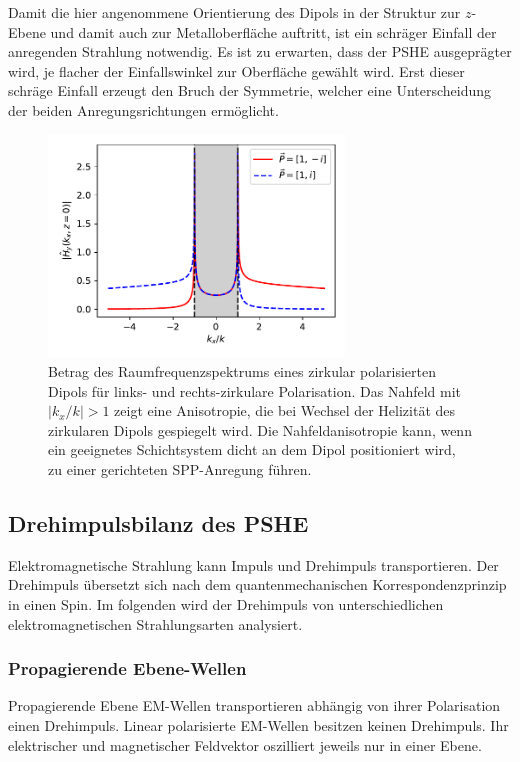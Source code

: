 \documentclass[a4paper, titlepage,  ngerman]{book}
\begin{document}
	Damit die hier angenommene Orientierung des Dipols in der Struktur zur $z$-Ebene und damit auch zur Metalloberfläche auftritt, ist ein schräger Einfall der anregenden Strahlung notwendig. Es ist zu erwarten, dass der PSHE ausgeprägter wird, je flacher der Einfallswinkel zur Oberfläche gewählt wird. Erst dieser schräge Einfall erzeugt den Bruch der Symmetrie, welcher eine Unterscheidung der beiden Anregungsrichtungen ermöglicht.
	\begin{figure}
		\centering
		\includegraphics[width=0.7\textwidth]{figures/spatial_spectrum_circ.pdf}
		\caption[Raumfrequenzspektrum zirkular polarisierter Dipol]{Betrag des Raumfrequenzspektrums eines zirkular polarisierten Dipols für links- und rechts-zirkulare Polarisation. Das Nahfeld mit $|k_x/k| >1$ zeigt eine Anisotropie, die bei Wechsel der Helizität des zirkularen Dipols gespiegelt wird. Die Nahfeldanisotropie kann, wenn ein geeignetes Schichtsystem dicht an dem Dipol positioniert wird, zu einer gerichteten SPP-Anregung führen.}
		\label{fig:spatial_spectrum_circ}
	\end{figure}	
	
	
	
	\subsection{Drehimpulsbilanz des PSHE}
	\label{sec:spin_spp}
	Elektromagnetische Strahlung kann Impuls und Drehimpuls transportieren. Der Drehimpuls übersetzt sich nach dem quantenmechanischen Korrespondenzprinzip in einen Spin. Im folgenden wird der Drehimpuls von unterschiedlichen elektromagnetischen Strahlungsarten analysiert.
	\subsubsection{Propagierende Ebene-Wellen}
	Propagierende Ebene EM-Wellen transportieren abhängig von ihrer Polarisation einen Drehimpuls. Linear polarisierte EM-Wellen besitzen keinen Drehimpuls. Ihr elektrischer und magnetischer Feldvektor oszilliert jeweils nur in einer Ebene.
	
\end{document}
